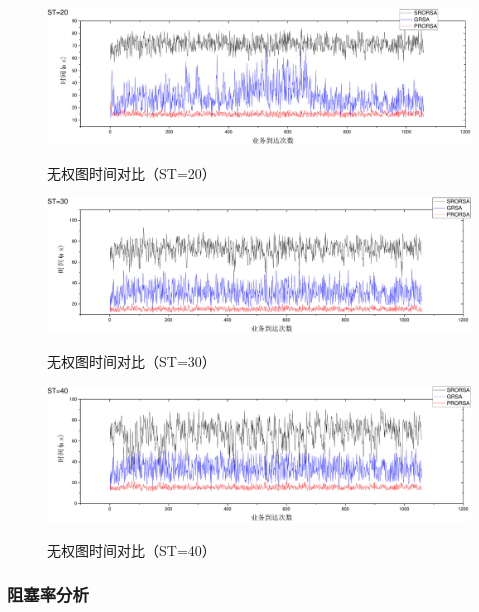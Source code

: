 \begin{figure}
\setlength{\belowcaptionskip}{-0.5cm}
\begin{center}
{\includegraphics[width=1 \textwidth]{figures/B20T.pdf}}
\end{center}
\caption{{\footnotesize{无权图时间对比（ST=20）}}}
\label{B20T}
\end{figure}
\begin{figure}
\setlength{\belowcaptionskip}{-0.5cm}
\begin{center}
{\includegraphics[width=1 \textwidth]{figures/B30T.pdf}}
\end{center}
\caption{{\footnotesize{无权图时间对比（ST=30）}}}
\label{B30T}
\end{figure}
\begin{figure}
\setlength{\belowcaptionskip}{-0.5cm}
\begin{center}
{\includegraphics[width=1 \textwidth]{figures/B40T.pdf}}
\end{center}
\caption{{\footnotesize{无权图时间对比（ST=40）}}}
\label{B40T}
\end{figure}
\subsubsection{阻塞率分析}

